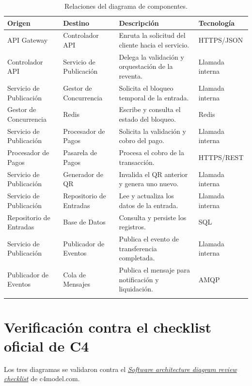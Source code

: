\documentclass[12pt,a4paper]{article}
\begin{document}
\begin{longtable}{p{3.2cm}p{3.2cm}p{5.7cm}p{2.3cm}}
\toprule
\textbf{Origen} & \textbf{Destino} & \textbf{Descripción} & \textbf{Tecnología}\\
\midrule
API Gateway & Controlador API & Enruta la solicitud del cliente hacia el servicio. & HTTPS/JSON\\
Controlador API & Servicio de Publicación & Delega la validación y orquestación de la reventa. & Llamada interna\\
Servicio de Publicación & Gestor de Concurrencia & Solicita el bloqueo temporal de la entrada. & Llamada interna\\
Gestor de Concurrencia & Redis & Escribe y consulta el estado del bloqueo. & Redis\\
Servicio de Publicación & Procesador de Pagos & Solicita la validación y cobro del pago. & Llamada interna\\
Procesador de Pagos & Pasarela de Pagos & Procesa el cobro de la transacción. & HTTPS/REST\\
Servicio de Publicación & Generador de QR & Invalida el QR anterior y genera uno nuevo. & Llamada interna\\
Servicio de Publicación & Repositorio de Entradas & Lee y actualiza los datos de la entrada. & Llamada interna\\
Repositorio de Entradas & Base de Datos & Consulta y persiste los registros. & SQL\\
Servicio de Publicación & Publicador de Eventos & Publica el evento de transferencia completada. & Llamada interna\\
Publicador de Eventos & Cola de Mensajes & Publica el mensaje para notificación y liquidación. & AMQP\\
\bottomrule
\caption{Relaciones del diagrama de componentes.}
\end{longtable}

\section{Verificación contra el checklist oficial de C4}

Los tres diagramas se validaron contra el
\href{https://c4model.com/diagrams/checklist}{\textit{Software architecture diagram review checklist}}
de c4model.com.
\end{document}
